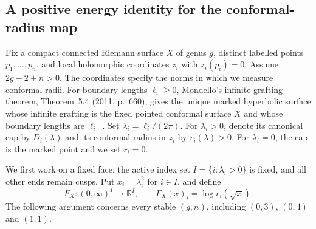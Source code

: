 \subsection{A positive energy identity for the conformal-radius map}
\label{C:A2b-energy-section}

Fix a compact connected Riemann surface $X$ of genus $g$, distinct labelled points $p_1,\ldots,p_n$, and local holomorphic coordinates $z_i$ with $z_i(p_i)=0$. Assume $2g-2+n>0$. The coordinates specify the norms in which we measure conformal radii. For boundary lengths $\ell_i\geq0$, Mondello's infinite-grafting theorem, Theorem~5.4 (2011, p.~660), gives the unique marked hyperbolic surface whose infinite grafting is the fixed pointed conformal surface $X$ and whose boundary lengths are $\ell_i$~\cite{C_Mondello2011}. Set $\lambda_i=\ell_i/(2\pi)$. For $\lambda_i>0$, denote its canonical cap by $D_i(\lambda)$ and its conformal radius in $z_i$ by $r_i(\lambda)>0$. For $\lambda_i=0$, the cap is the marked point and we set $r_i=0$.

We first work on a fixed face: the active index set $I=\{i:\lambda_i>0\}$ is fixed, and all other ends remain cusps. Put $x_i=\lambda_i^2$ for $i\in I$, and define
\[
 F_X:(0,\infty)^I\longrightarrow\mathbb R^I,
 \qquad F_X(x)_i=\log r_i(\sqrt{x}).
\]
The following argument concerns every stable $(g,n)$, including $(0,3)$, $(0,4)$ and $(1,1)$.

